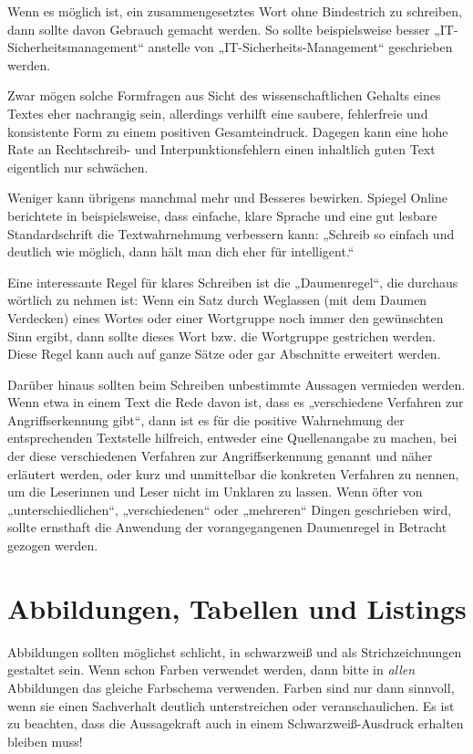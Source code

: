 \documentclass[
    fontsize=12pt,
    headings=small,
    parskip=half,           %
    bibliography=totoc,
    numbers=noenddot,       %
    open=any,               %
    ]{scrreprt}
\begin{document}
Wenn es möglich ist, ein zusammengesetztes Wort ohne Bindestrich zu schreiben, dann sollte davon Gebrauch gemacht werden. So sollte beispielsweise besser „IT-Sicherheitsmanagement“ anstelle von „IT-Sicherheits-Management“ geschrieben werden.

Zwar mögen solche Formfragen aus Sicht des wissenschaftlichen Gehalts eines Textes eher nachrangig sein, allerdings verhilft eine saubere, fehlerfreie und konsistente Form zu einem positiven Gesamteindruck. Dagegen kann eine hohe Rate an Rechtschreib- und Interpunktionsfehlern einen inhaltlich guten Text eigentlich nur schwächen. 

Weniger kann übrigens manchmal mehr und Besseres bewirken. Spiegel Online berichtete in \cite{textwahrnehmung} beispielsweise, dass einfache, klare Sprache und eine gut lesbare Standardschrift die Textwahrnehmung verbessern kann: „Schreib so einfach und deutlich wie möglich, dann hält man dich eher für intelligent.“

Eine interessante Regel für klares Schreiben ist die „Daumenregel“, die durchaus wörtlich zu nehmen ist: Wenn ein Satz durch Weglassen (mit dem Daumen Verdecken) eines Wortes oder einer Wortgruppe noch immer den gewünschten Sinn ergibt, dann sollte dieses Wort bzw. die Wortgruppe gestrichen werden. Diese Regel kann auch auf ganze Sätze oder gar Abschnitte erweitert werden.

Darüber hinaus sollten beim Schreiben unbestimmte Aussagen vermieden werden. Wenn etwa in einem Text die Rede davon ist, dass es „verschiedene Verfahren zur Angriffserkennung gibt“, dann ist es für die positive Wahrnehmung der entsprechenden Textstelle hilfreich, entweder eine Quellenangabe zu machen, bei der diese verschiedenen Verfahren zur Angriffserkennung genannt und näher erläutert werden, oder kurz und unmittelbar die konkreten Verfahren zu nennen, um die Leserinnen und Leser nicht im Unklaren zu lassen. Wenn öfter von „unterschiedlichen“, „verschiedenen“ oder „mehreren“ Dingen geschrieben wird, sollte ernsthaft die Anwendung der vorangegangenen Daumenregel in Betracht gezogen werden. 

\section{Abbildungen, Tabellen und Listings}

Abbildungen sollten möglichst schlicht, in schwarzweiß und als Strichzeichnungen gestaltet sein. Wenn schon Farben verwendet werden, dann bitte in \emph{allen} Abbildungen das gleiche Farbschema verwenden. Farben sind nur dann sinnvoll, wenn sie einen Sachverhalt deutlich unterstreichen oder veranschaulichen. Es ist zu beachten, dass die Aussagekraft auch in einem Schwarzweiß-Ausdruck erhalten bleiben muss!
\end{document}
